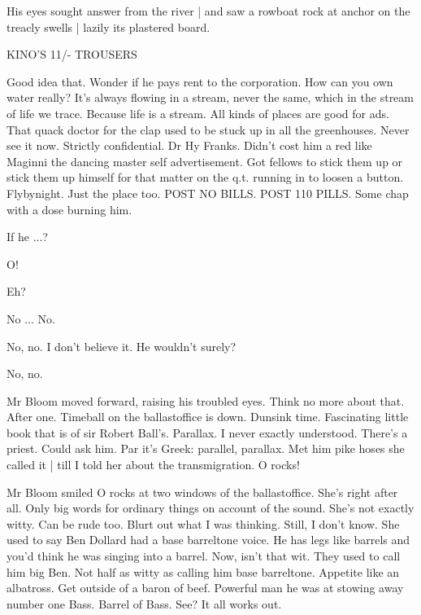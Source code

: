 His eyes sought answer from the river |
and saw a rowboat rock at anchor on the treacly swells |
lazily its plastered board.

KINO'S
11/-
TROUSERS

Good idea that.
Wonder if he pays rent to the corporation.
How can you own water really?
It's always flowing in a stream,
never the same,
which in the stream of life we trace.
Because life is a stream.
All kinds of places are good for ads.
That quack doctor for the clap used to be stuck up in all the greenhouses.
Never see it now.
Strictly confidential.
Dr Hy Franks.
Didn't cost him a red
like Maginni the dancing master
self advertisement.
Got fellows to stick them up
or stick them up himself
for that matter
on the q.t. running in to loosen a button.
Flybynight.
Just the place too.
POST NO BILLS.
POST 110 PILLS.
Some chap with a dose burning him.

If he ...?

O!

Eh?

No ...
No.

No, no.
I don't believe it.
He wouldn't surely?

No, no.

Mr Bloom moved forward, raising his troubled eyes.
Think no more about that.
After one.
Timeball on the ballastoffice is down.
Dunsink time.
Fascinating little book that is of sir Robert Ball's.
Parallax.
I never exactly understood.
There's a priest.
Could ask him.
Par it's Greek:
parallel, parallax.
Met him pike hoses she called it |
till I told her about the transmigration.
O rocks!

Mr Bloom smiled O rocks at two windows of the ballastoffice.
She's right after all.
Only big words for ordinary things on account of the sound.
She's not exactly witty.
Can be rude too.
Blurt out what I was thinking.
Still, I don't know.
She used to say Ben Dollard had a base barreltone voice.
He has legs like barrels and you'd think he was singing into a barrel.
Now, isn't that wit.
They used to call him big Ben.
Not half as witty as calling him base barreltone.
Appetite like an albatross.
Get outside of a baron of beef.
Powerful man he was at stowing away number one Bass.
Barrel of Bass.
See?
It all works out.



